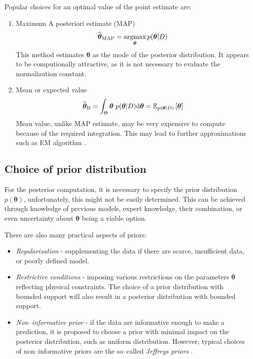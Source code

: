 Popular choices for an optimal value of the point estimate are:
\begin{enumerate}
	\item Maximum A posteriori estimate (MAP)
	\begin{equation}
		\widehat{\boldsymbol{\theta}}_{\mathrm{MAP}} = \mathop{\mathrm{argmax}}_{\boldsymbol{\theta}} p(\boldsymbol{\theta} | D)
	\end{equation}
This method estimates $\boldsymbol{\theta}$ as the mode of the posterior distribution. It appears to be computionally attractive, as it is not necessary to evaluate the normalization constant. 
\item Mean or expected value
\begin{equation}
	\widehat{\boldsymbol{\theta}}_{\mathrm{B}} = \int_{\Theta} \boldsymbol{\theta}~ p(\boldsymbol{\theta} | D) \mathrm{d}\boldsymbol{\theta} = \mathbb{E}_{p(\boldsymbol{\theta} | D) }\left[\boldsymbol{\theta} \right]
\end{equation}
Mean value, unlike MAP estimate, may be very expensive to compute because of the required integration. This may lead to further approximations such as EM algorithm \cite{EM}.
\end{enumerate}	

\subsection{Choice of prior distribution}
For the posterior computation, it is necessary to specify the prior distribution $p(\boldsymbol{\theta})$, unfortunately, this might not be easily determined. This can be achieved through knowledge of previous models, expert knowledge, their combination, or even uncertainty about $\boldsymbol{\theta}$ being a viable option. 

There are also many practical aspects of priors:
\begin{itemize}
	\item \emph{Regularization} - supplementing the data if there are scarce, insufficient data, or poorly defined model. 
	\item \emph{Restrictive conditions} - imposing various restrictions on the parameters $\boldsymbol{\theta}$ reflecting physical constraints. The choice of a prior distribution with bounded support will also result in a posterior distribution with bounded support. 
	\item \emph{Non--informative prior} - if the data are informative enough to make a prediction, it is proposed to choose a prior with minimal impact on the posterior distribution, such as uniform distribution. However, typical choices of non--informative priors are the so--called \emph{Jeffreys priors} \cite{jeffrey}.
\end{itemize}



